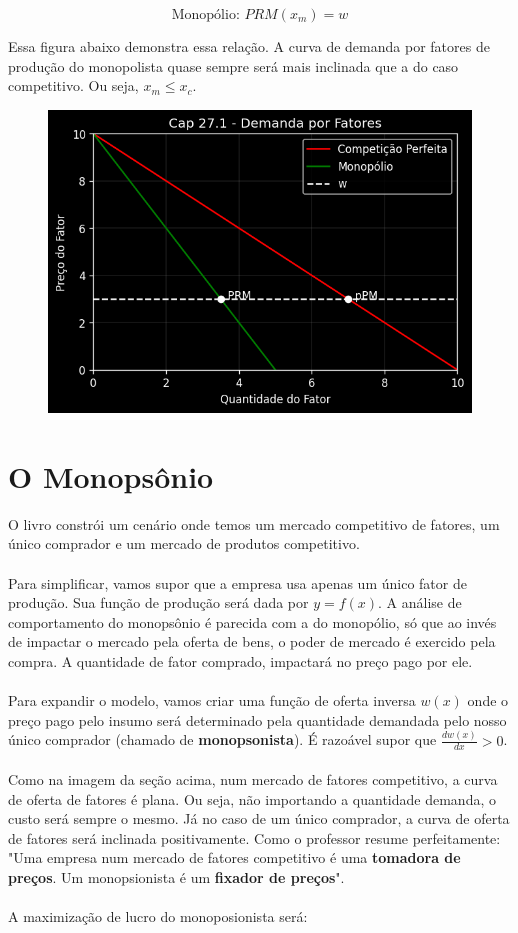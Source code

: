 \documentclass[a4paper,11pt,oneside]{book}
\theoremstyle{definition}
\theoremstyle{break}
\begin{document}
$$ \textrm{Monopólio: } PRM(x_m) = w $$

Essa figura abaixo demonstra essa relação. A curva de demanda por fatores de produção do monopolista quase sempre será mais inclinada que a do caso competitivo. Ou seja, $x_m \leq x_c$.

\begin{figure}[H]
\centering
\includegraphics[scale=0.75]{cap27_1-demanda_fatores.png}
\end{figure}

\section{O Monopsônio}

O livro constrói um cenário onde temos um mercado competitivo de fatores, um único comprador e um mercado de produtos competitivo.
\\
\\
Para simplificar, vamos supor que a empresa usa apenas um único fator de produção. Sua função de produção será dada por $y = f(x)$.  A análise de comportamento do monopsônio é parecida com a do monopólio, só que ao invés de impactar o mercado pela oferta de bens, o poder de mercado é exercido pela compra. A quantidade de fator comprado, impactará no preço pago por ele.
\\
\\
Para expandir o modelo, vamos criar uma função de oferta inversa $w(x)$ onde o preço pago pelo insumo será determinado pela quantidade demandada pelo nosso único comprador (chamado de \textbf{monopsonista}). É razoável supor que $\frac{d w(x)}{d x} > 0$.
\\
\\
Como na imagem da seção acima, num mercado de fatores competitivo, a curva de oferta de fatores é plana. Ou seja, não importando a quantidade demanda, o custo será sempre o mesmo. Já no caso de um único comprador, a curva de oferta de fatores será inclinada positivamente. Como o professor resume perfeitamente: "Uma empresa num mercado de fatores competitivo é uma \textbf{tomadora de preços}. Um monopsionista é um \textbf{fixador de preços}".
\\
\\
A maximização de lucro do monoposionista será:
\end{document}

